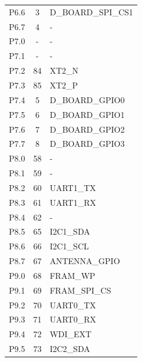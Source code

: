 \begin{longtable}{lcL{10cm}}
    P6.6              & 3                   & D\_BOARD\_SPI\_CS1    \\
    P6.7              & 4                   & -                     \\
    \midrule
    P7.0              & -                   & -                     \\
    P7.1              & -                   & -                     \\
    P7.2              & 84                  & XT2\_N                \\
    P7.3              & 85                  & XT2\_P                \\
    P7.4              & 5                   & D\_BOARD\_GPIO0       \\
    P7.5              & 6                   & D\_BOARD\_GPIO1       \\
    P7.6              & 7                   & D\_BOARD\_GPIO2       \\
    P7.7              & 8                   & D\_BOARD\_GPIO3       \\
    \midrule
    P8.0              & 58                  & -                     \\
    P8.1              & 59                  & -                     \\
    P8.2              & 60                  & UART1\_TX             \\
    P8.3              & 61                  & UART1\_RX             \\
    P8.4              & 62                  & -                     \\
    P8.5              & 65                  & I2C1\_SDA             \\
    P8.6              & 66                  & I2C1\_SCL             \\
    P8.7              & 67                  & ANTENNA\_GPIO         \\
    \midrule
    P9.0              & 68                  & FRAM\_WP              \\
    P9.1              & 69                  & FRAM\_SPI\_CS         \\
    P9.2              & 70                  & UART0\_TX             \\
    P9.3              & 71                  & UART0\_RX             \\
    P9.4              & 72                  & WDI\_EXT              \\
    P9.5              & 73                  & I2C2\_SDA             \\

\end{longtable}
